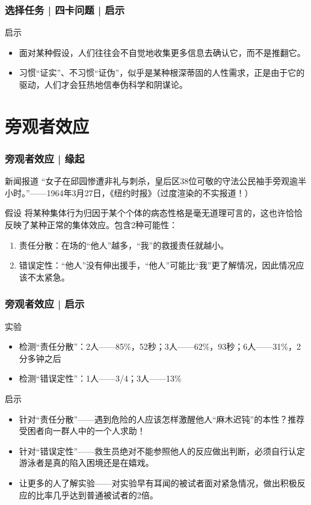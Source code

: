 \begin{frame}
  \frametitle{选择任务 | 四卡问题 | 启示}
  \begin{block}{启示}
    \begin{itemize}
      \item 面对某种假设，人们往往会不自觉地收集更多信息去确认它，而不是推翻它。
      \item 习惯“证实”、不习惯“证伪”，似乎是某种根深蒂固的人性需求，正是由于它的驱动，人们才会狂热地信奉伪科学和阴谋论。
    \end{itemize}
  \end{block}
\end{frame}

\section{旁观者效应}
\begin{frame}
  \frametitle{旁观者效应 | 缘起}
  \begin{block}{新闻报道}
    “女子在邱园惨遭非礼与刺杀，皇后区38位可敬的守法公民袖手旁观逾半小时。”——1964年3月27日，《纽约时报》（过度渲染的不实报道！）
  \end{block}
  \pause
  \begin{block}{假设}
    将某种集体行为归因于某个个体的病态性格是毫无道理可言的，这也许恰恰反映了某种正常的集体效应。包含2种可能性：
    \begin{enumerate}
      \item 责任分散：在场的“他人”越多，“我”的救援责任就越小。
      \item 错误定性：“他人”没有伸出援手，“他人”可能比“我”更了解情况，因此情况应该不太紧急。
    \end{enumerate}
  \end{block}
\end{frame}

\begin{frame}
  \frametitle{旁观者效应 | 启示}
  \begin{block}{实验}
    \begin{itemize}
      \item 检测“责任分散”：2人——85\%，52秒；3人——62\%，93秒；6人——31\%，2分多钟之后
      \item 检测“错误定性”：1人——3/4；3人——13\%
    \end{itemize}
  \end{block}
  \pause
  \begin{block}{启示}
    \begin{itemize}
      \item 针对“责任分散”——遇到危险的人应该怎样激醒他人“麻木迟钝”的本性？推荐受困者向一群人中的一个人求助！
      \item 针对“错误定性”——救生员绝对不能参照他人的反应做出判断，必须自行认定游泳者是真的陷入困境还是在嬉戏。
      \item 让更多的人了解实验——对实验早有耳闻的被试者面对紧急情况，做出积极反应的比率几乎达到普通被试者的2倍。
    \end{itemize}
  \end{block}
\end{frame}

